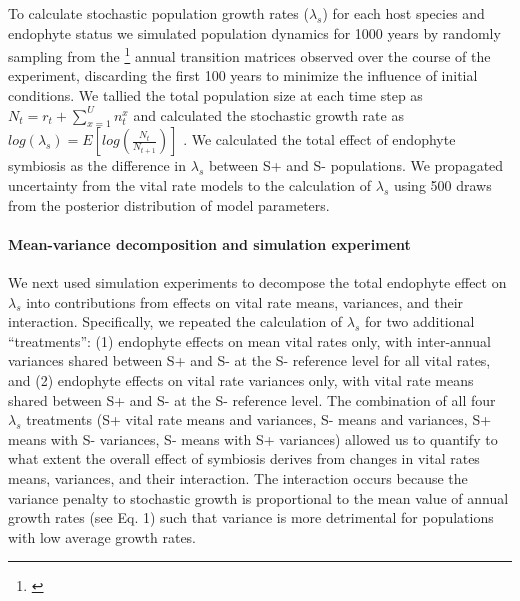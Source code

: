 \documentclass[12pt]{article}
\newcommand{\tom}[2]{{\color{red}{#1}}\footnote{\textit{\color{red}{#2}}}}
\begin{document}
To calculate stochastic population growth rates ($\lambda_s$) for each host species and endophyte status we simulated population dynamics for 1000 years by randomly sampling from the \tom{14}{or is it 13?} annual transition matrices observed over the course of the experiment, discarding the first 100 years to minimize the influence of initial conditions. 
We tallied the total population size at each time step as  $N_{t} = r_{t} + \sum_{x=1}^{U}n^x_{t}$ and calculated the stochastic growth rate as $log(\lambda_s) = E[log(\frac{N_{t}}{N_{t+1}})]$ \cite{caswell2001matrix,rees2009integral}.
We calculated the total effect of endophyte symbiosis as the difference in $\lambda_s$ between S+ and S- populations. 
We propagated uncertainty from the vital rate models to the calculation of $\lambda_s$ using 500 draws from the posterior distribution of model parameters. 

\paragraph*{Mean-variance decomposition and simulation experiment}
We next used simulation experiments to decompose the total endophyte effect on $\lambda_s$ into contributions from effects on vital rate means, variances, and their interaction. 
Specifically, we repeated the calculation of $\lambda_s$ for two additional ``treatments'': (1) endophyte effects on mean vital rates only, with inter-annual variances shared between S+ and S- at the S- reference level for all vital rates, and (2) endophyte effects on vital rate variances only, with vital rate means shared between S+ and S- at the S- reference level. 
The combination of all four $\lambda_s$ treatments (S+ vital rate means and variances, S- means and variances, S+ means with S- variances, S- means with S+ variances) allowed us to quantify to what extent the overall effect of symbiosis derives from changes in vital rates means, variances, and their interaction. 
The interaction occurs because the variance penalty to stochastic growth is proportional to the mean value of annual growth rates (see Eq. 1) such that variance is more detrimental for populations with low average growth rates. 
\end{document}
